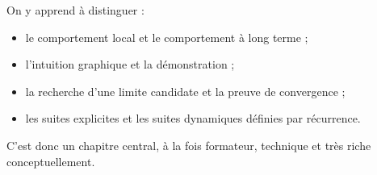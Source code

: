 \documentclass[11pt,a4paper]{article}
\theoremstyle{definition}
\theoremstyle{plain}
\theoremstyle{remark}
\begin{document}
On y apprend à distinguer :
\begin{itemize}[leftmargin=0.8cm]
    \item le comportement local et le comportement à long terme ;
    \item l'intuition graphique et la démonstration ;
    \item la recherche d'une limite candidate et la preuve de convergence ;
    \item les suites explicites et les suites dynamiques définies par récurrence.
\end{itemize}

C'est donc un chapitre central, à la fois formateur, technique et très riche conceptuellement.
\end{document}
